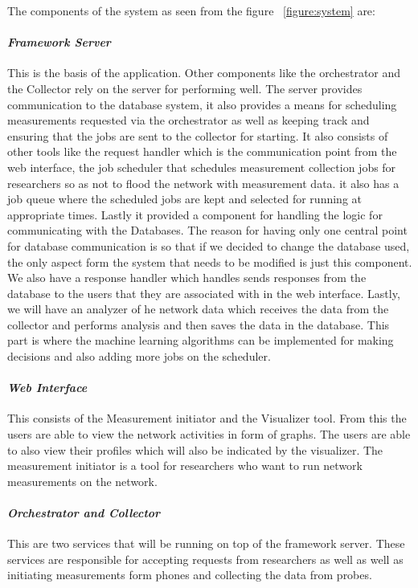 The components of the system as seen from the figure ~\ref{figure:system} are:
\paragraph{\textit{Framework Server}}
This is the basis of the application. Other components like the orchestrator and the Collector rely on the server for performing well. The server provides communication to the database system, it also provides a means for scheduling measurements requested via the orchestrator as well as keeping track and ensuring that the jobs are sent to the collector for starting. It also consists of other tools like the request handler which is the communication point from the web interface, the job scheduler that schedules measurement collection jobs for researchers so as not to flood the network with measurement data. it also has a job queue where the scheduled jobs are kept and selected for running at appropriate times. Lastly it provided a component for handling the logic for communicating with the Databases. The reason for having only one central point for database communication is so that if we decided to change the database used, the only aspect form the system that needs to be modified is just this component. We also have a response handler which handles sends responses from the database to the users that they are associated with in the web interface. Lastly, we will have an analyzer of he network data which receives the data from the collector and performs analysis and then saves the data in the database. This part is where the machine learning algorithms can be implemented for making decisions and also adding more jobs on the scheduler.

\paragraph{\textit{Web Interface}}
This consists of the Measurement initiator and the Visualizer tool. From this the users are able to view the network activities in form of graphs. The users are able to also view their profiles which will also be indicated by the visualizer. The measurement initiator is a tool for researchers who want to run network measurements on the network.

\paragraph{\textit{Orchestrator and Collector}}
This are two services that will be running on top of the framework server. These services are responsible for accepting requests from researchers as well as well as initiating measurements form phones and collecting the data from probes.

